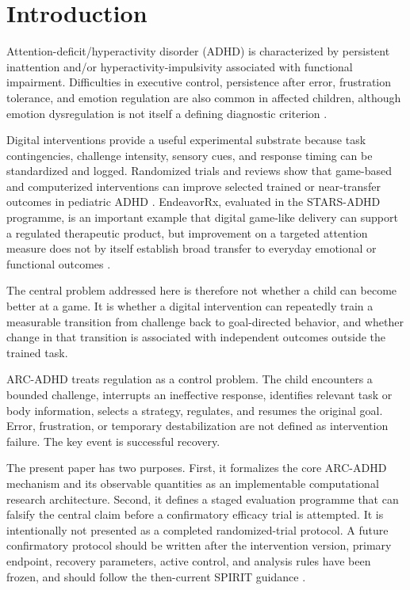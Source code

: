 \section{Introduction}

Attention-deficit/hyperactivity disorder (ADHD) is characterized by persistent inattention and/or hyperactivity-impulsivity associated with functional impairment. Difficulties in executive control, persistence after error, frustration tolerance, and emotion regulation are also common in affected children, although emotion dysregulation is not itself a defining diagnostic criterion \parencite{graziano2016dysregulation,wolraich2019guideline}.

Digital interventions provide a useful experimental substrate because task contingencies, challenge intensity, sensory cues, and response timing can be standardized and logged. Randomized trials and reviews show that game-based and computerized interventions can improve selected trained or near-transfer outcomes in pediatric ADHD \parencite{kollins2020stars,oh2024dtx,lin2025seriousgames,yan2026ceft}. EndeavorRx, evaluated in the STARS-ADHD programme, is an important example that digital game-like delivery can support a regulated therapeutic product, but improvement on a targeted attention measure does not by itself establish broad transfer to everyday emotional or functional outcomes \parencite{kollins2020stars}.

The central problem addressed here is therefore not whether a child can become better at a game. It is whether a digital intervention can repeatedly train a measurable transition from challenge back to goal-directed behavior, and whether change in that transition is associated with independent outcomes outside the trained task.

ARC-ADHD treats regulation as a control problem. The child encounters a bounded challenge, interrupts an ineffective response, identifies relevant task or body information, selects a strategy, regulates, and resumes the original goal. Error, frustration, or temporary destabilization are not defined as intervention failure. The key event is successful recovery.

The present paper has two purposes. First, it formalizes the core ARC-ADHD mechanism and its observable quantities as an implementable computational research architecture. Second, it defines a staged evaluation programme that can falsify the central claim before a confirmatory efficacy trial is attempted. It is intentionally not presented as a completed randomized-trial protocol. A future confirmatory protocol should be written after the intervention version, primary endpoint, recovery parameters, active control, and analysis rules have been frozen, and should follow the then-current SPIRIT guidance \parencite{chan2025spirit}.

